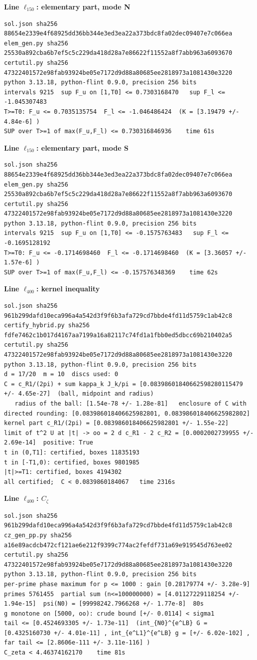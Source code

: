 \documentclass[11pt,reqno]{amsart}
\numberwithin{equation}{section}
\theoremstyle{definition}
\theoremstyle{remark}
\newcommand{\appsub}[1]{\par\medskip\noindent\textbf{#1}\par\nobreak\smallskip}
\begin{document}
\appsub{Line $\ell_{150}$: elementary part, mode N}
\begin{lstlisting}
sol.json sha256 88654e2339e4f68925dd36bb344e3ed3ea22a373bdc8fa02dec09407e7c066ea
elem_gen.py sha256 25530a892cba6b7ef5c5c229da418d28a7e86622f11552a8f7abb963a6093670
certutil.py sha256 47322401572e98fab93924be05e7172d9d88a80685ee2818973a1081430e3220
python 3.13.18, python-flint 0.9.0, precision 256 bits
intervals 9215  sup F_u on [1,T0] <= 0.7303168470   sup F_l <= -1.045307483
T>=T0: F_u <= 0.7035135754  F_l <= -1.046486424  (K = [3.19479 +/- 4.84e-6] )
SUP over T>=1 of max(F_u,F_l) <= 0.730316846936    time 61s
\end{lstlisting}
\appsub{Line $\ell_{150}$: elementary part, mode S}
\begin{lstlisting}
sol.json sha256 88654e2339e4f68925dd36bb344e3ed3ea22a373bdc8fa02dec09407e7c066ea
elem_gen.py sha256 25530a892cba6b7ef5c5c229da418d28a7e86622f11552a8f7abb963a6093670
certutil.py sha256 47322401572e98fab93924be05e7172d9d88a80685ee2818973a1081430e3220
python 3.13.18, python-flint 0.9.0, precision 256 bits
intervals 9215  sup F_u on [1,T0] <= -0.1575763483   sup F_l <= -0.1695128192
T>=T0: F_u <= -0.1714698460  F_l <= -0.1714698460  (K = [3.36057 +/- 1.57e-6] )
SUP over T>=1 of max(F_u,F_l) <= -0.157576348369    time 62s
\end{lstlisting}
\appsub{Line $\ell_{400}$: kernel inequality}
\begin{lstlisting}
sol.json sha256 961b299dafd10eca996a4a542d3f9f6b3afa729cd7bbde4fd11d5759c1ab42c8
certify_hybrid.py sha256 fdfe7462c1b017d4167aa7199a16a82117c74fd1a1fbb0ed5dbcc69b210402a5
certutil.py sha256 47322401572e98fab93924be05e7172d9d88a80685ee2818973a1081430e3220
python 3.13.18, python-flint 0.9.0, precision 256 bits
d = 17/20  m = 10  discs used: 0 
C = c_R1/(2pi) + sum kappa_k J_k/pi = [0.08398601840662598280115479 +/- 4.65e-27]  (ball, midpoint and radius)
   radius of the ball: [1.54e-78 +/- 1.28e-81]   enclosure of C with directed rounding: [0.083986018406625982801, 0.083986018406625982802]
kernel part c_R1/(2pi) = [0.083986018406625982801 +/- 1.55e-22]
limit of t^2 U at |t| -> oo = 2 d c_R1 - 2 c_R2 = [0.0002002739955 +/- 2.69e-14]  positive: True
t in (0,T1]: certified, boxes 11835193
t in [-T1,0): certified, boxes 9801985
|t|>=T1: certified, boxes 4194302
all certified;  C < 0.0839860184067   time 2316s
\end{lstlisting}
\appsub{Line $\ell_{400}$: $C_\zeta$}
\begin{lstlisting}
sol.json sha256 961b299dafd10eca996a4a542d3f9f6b3afa729cd7bbde4fd11d5759c1ab42c8
cz_gen_pp.py sha256 a16e89acdcb472cf121ae6e212f9399c774ac2fefdf731a69e919545d763ee02
certutil.py sha256 47322401572e98fab93924be05e7172d9d88a80685ee2818973a1081430e3220
python 3.13.18, python-flint 0.9.0, precision 256 bits
per-prime phase maximum for p <= 1000 : gain [0.28179774 +/- 3.28e-9]
primes 5761455  partial sum (n<=100000000) = [4.01127229118254 +/- 1.94e-15]  psi(N0) = [99998242.7966268 +/- 1.77e-8]  80s
g monotone on [5000, oo): crude bound [+/- 0.0114] < sigma1
tail <= [0.4524693305 +/- 1.73e-11]  (int_{N0}^{e^LB} G = [0.4325160730 +/- 4.01e-11] , int_{e^L1}^{e^LB} g = [+/- 6.02e-102] , far tail <= [2.8606e-111 +/- 3.11e-116] )
C_zeta < 4.46374162170    time 81s
\end{lstlisting}
\end{document}
